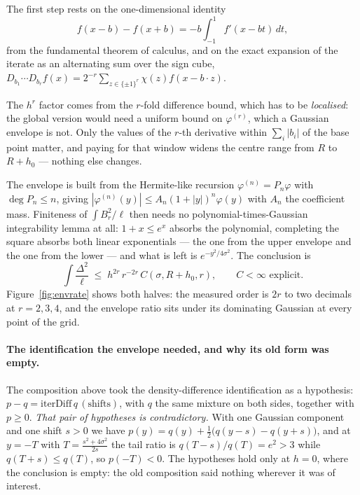 The first step rests on the one-dimensional identity
\[
f(x-b)-f(x+b)=-b\int_{-1}^{1}f'(x-bt)\,dt,
\]
from the fundamental theorem of calculus, and on the exact expansion of the iterate as an
alternating sum over the sign cube,
$D_{b_{1}}\cdots D_{b_{r}}f(x)=2^{-r}\sum_{z\in\{\pm1\}^{r}}\chi(z)f(x-b\cdot z)$.

The $h^{r}$ factor comes from the $r$-fold difference bound, which has to be
\emph{localised}: the global version would need a uniform bound on $\varphi^{(r)}$, which a
Gaussian envelope is not. Only the values of the $r$-th derivative within
$\sum_{i}|b_{i}|$ of the base point matter, and paying for that window widens the centre
range from $R$ to $R+h_{0}$ --- nothing else changes.

The envelope is built from the Hermite-like recursion $\varphi^{(n)}=P_{n}\varphi$ with
$\deg P_{n}\le n$, giving $|\varphi^{(n)}(y)|\le A_{n}(1+|y|)^{n}\varphi(y)$ with $A_{n}$
the coefficient mass. Finiteness of $\int B_{r}^{2}/\ell$ then needs no
polynomial-times-Gaussian integrability lemma at all: $1+x\le e^{x}$ absorbs the
polynomial, completing the square absorbs both linear exponentials --- the one from the
upper envelope and the one from the lower --- and what is left is $e^{-y^{2}/4\sigma^{2}}$.
The conclusion is
\[
\int \frac{\Delta^{2}}{\ell}\;\le\;h^{2r}\,r^{-2r}\,C(\sigma,R+h_{0},r),
\qquad C<\infty \text{ explicit.}
\]
Figure~\ref{fig:envrate} shows both halves: the measured order is $2r$ to two decimals at
$r=2,3,4$, and the envelope ratio sits under its dominating Gaussian at every point of the
grid. \NUM{}


\paragraph{The identification the envelope needed, and why its old form was empty.}
The composition above took the density-difference identification as a hypothesis:
$p-q=\mathrm{iterDiff}\,q\,(\text{shifts})$, with $q$ the same mixture on both sides,
together with $p\ge0$. \emph{That pair of hypotheses is contradictory.} With one Gaussian
component and one shift $s>0$ we have $p(y)=q(y)+\tfrac12\bigl(q(y-s)-q(y+s)\bigr)$, and at
$y=-T$ with $T=\frac{s^{2}+4\sigma^{2}}{2s}$ the tail ratio is $q(T-s)/q(T)=e^{2}>3$ while
$q(T+s)\le q(T)$, so $p(-T)<0$. The hypotheses hold only at $h=0$, where the conclusion is
empty: the old composition said nothing wherever it was of interest.

